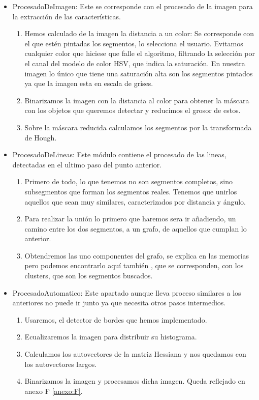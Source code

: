 \begin{itemize}
\item ProcesadoDeImagen: Este se corresponde con el procesado de la imagen para la extracción de las características.
	\begin{enumerate}

	\item Hemos calculado de la imagen la distancia a un color: Se corresponde con el que estén pintadas los segmentos, lo selecciona el usuario. Evitamos cualquier color que hiciese que falle el algoritmo, filtrando la selección por el canal del modelo de color HSV, que indica la saturación. En nuestra imagen lo único que tiene una saturación alta son los segmentos pintados ya que la imagen esta en escala de grises.

	\item Binarizamos la imagen con la distancia al color para obtener la máscara con los objetos que queremos detectar y reducimos el grosor de estos.

	\item Sobre la máscara reducida calculamos los segmentos por la transformada de Hough.
	\end{enumerate}

\item ProcesadoDeLineas: Este módulo contiene el procesado de las lineas, detectadas en el ultimo paso del punto anterior.
\begin{enumerate}

\item Primero de todo, lo que tenemos no son segmentos completos, sino subsegmentos que forman los segmentos reales. Tenemos que unirlos aquellos que sean muy similares, caracterizados por distancia y ángulo.

\item Para realizar la unión lo primero que haremos sera ir añadiendo, un camino entre los dos segmentos, a un grafo, de aquellos que cumplan lo anterior.

\item Obtendremos las uno componentes del grafo, se explica en las memorias pero podemos encontrarlo aquí también \cite{Wiki:Grafos}, que se corresponden, con los clusters, que son los segmentos buscados.
\end{enumerate}

\item ProcesadoAutomatico: Este apartado aunque lleva proceso similares a los anteriores no puede ir junto ya que necesita otros pasos intermedios.
\begin{enumerate}

\item Usaremos, el detector de bordes que hemos implementado.
\item Ecualizaremos la imagen para distribuir su histograma.
\item Calculamos los autovectores de la matriz Hessiana y nos quedamos con los autovectores largos.
\item Binarizamos la imagen y procesamos dicha imagen. Queda reflejado en anexo F \ref{anexo:F}.
\end{enumerate}

\end{itemize}

